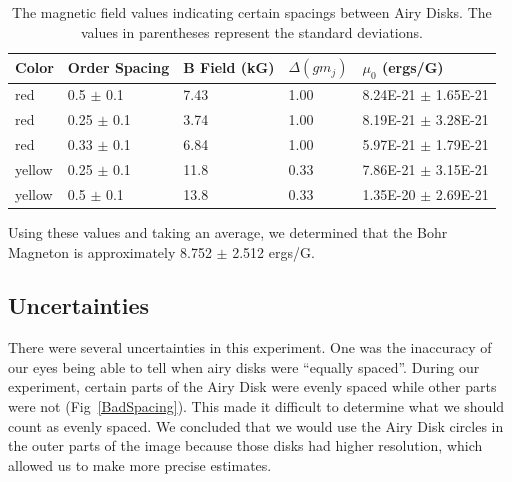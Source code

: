 \begin{table}[h]
\begin{tabular}{|l|l|l|l|l|}
\hline
Color  & Order Spacing & B Field (kG) & $\Delta(g m_{j})$ & $\mu_{0}$ (ergs/G) \\ \hline
red    & 0.5 $\pm$ 0.1          & 7.43         & 1.00        & 8.24E-21 $\pm$ 1.65E-21     \\
red    & 0.25 $\pm$ 0.1          & 3.74         & 1.00        & 8.19E-21 $\pm$ 3.28E-21     \\
red    & 0.33 $\pm$ 0.1          & 6.84         & 1.00        & 5.97E-21 $\pm$ 1.79E-21     \\
yellow & 0.25 $\pm$ 0.1          & 11.8         & 0.33        & 7.86E-21 $\pm$ 3.15E-21     \\
yellow & 0.5  $\pm$ 0.1          & 13.8         & 0.33        & 1.35E-20 $\pm$ 2.69E-21     \\ \hline
\end{tabular}
\caption{The magnetic field values indicating certain spacings between Airy Disks. The values in parentheses represent the standard deviations.}
\label{ZeemanAnalysis}
\end{table}

Using these values and taking an average, we determined that the Bohr Magneton is approximately 8.752 $\pm$ 2.512 ergs/G. 

\subsection{Uncertainties}

There were several uncertainties in this experiment. One was the inaccuracy of our eyes being able to tell when airy disks were ``equally spaced''. During our experiment, certain parts of the Airy Disk were evenly spaced while other parts were not (Fig~\ref{BadSpacing}). This made it difficult to determine what we should count as evenly spaced. We concluded that we would use the Airy Disk circles in the outer parts of the image because those disks had higher resolution, which allowed us to make more precise estimates. 


